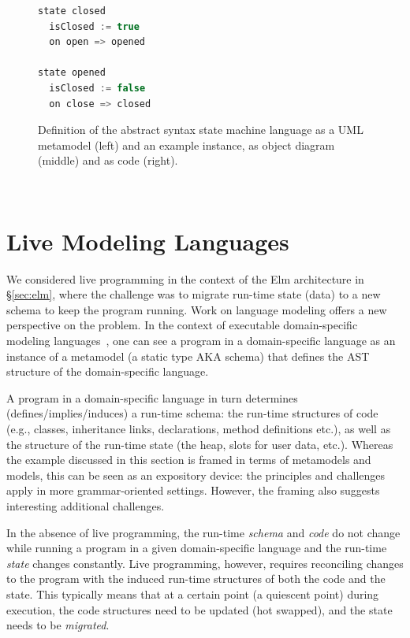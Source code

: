 \documentclass[english,submission]{programming}
\begin{document}
\begin{figure}[t]
\begin{adjustwidth}{-3em}{-3em}
\begin{minipage}{0.3\textwidth}
\begin{lstlisting}[language=java,morekeywords={machine,on,state,var},basicstyle=\footnotesize,numbers=none]
state closed
  isClosed := true
  on open => opened

state opened
  isClosed := false
  on close => closed
\end{lstlisting}
\end{minipage}
\end{adjustwidth}
\caption{Definition of the abstract syntax state machine language as a UML metamodel (left) and
an example instance, as object diagram (middle) and as code (right).}
\label{FIG:statemachineUML}
\end{figure}

~

\section{Live Modeling Languages}
\label{sec:livemodeling}

We considered live programming in the context of the Elm architecture in \S\ref{sec:elm},
where the challenge was to migrate run-time state (data) to a new schema to keep the program running.
Work on language modeling offers a new perspective on the problem.
In the context of executable domain-specific modeling languages~\cite{klint2011easy}, one can see a
program in a domain-specific language as an instance of a metamodel (a static type AKA schema) that
defines the AST structure of the domain-specific language.

A program in a domain-specific language in turn determines (defines/implies/induces) a run-time
schema: the run-time structures of code (e.g., classes, inheritance links, declarations, method
definitions etc.), as well as the structure of the run-time state (the heap, slots for user data, etc.).
Whereas the example discussed in this section is framed in terms of metamodels and models, this can
be seen as an expository device: the principles and challenges apply in more grammar-oriented settings.
However, the framing also suggests interesting additional challenges.

In the absence of live programming, the run-time \emph{schema} and \emph{code} do not change while
running a program in a given domain-specific language and the run-time \emph{state} changes constantly.
Live programming, however, requires reconciling changes to the program with the induced run-time structures
of both the code and the state. This typically means that at a certain point (a quiescent point)
during execution, the code structures need to be updated (hot swapped), and the state needs to be
\textit{migrated}.
\end{document}
